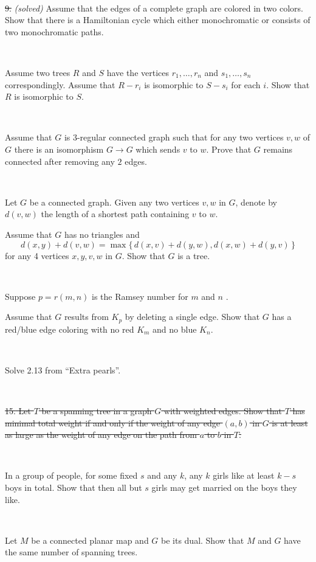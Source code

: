 \documentclass[oneside,a4paper]{article}
\begin{document}
\ 

\noindent \sout{9.} \textit{(solved)} 
Assume that the edges of a complete graph are colored in two colors.
Show that there is a Hamiltonian cycle which either monochromatic or consists of two monochromatic paths.

\ 

Assume two trees $R$ and $S$ 
have the vertices $r_1,\dots,r_n$ and $s_1,\dots,s_n$ correspondingly.
Assume that $R-r_i$ is isomorphic to $S-s_i$ for each $i$.
Show that $R$ is isomorphic to $S$.

\ 

Assume that $G$ is $3$-regular connected graph such that 
for any two vertices $v,w$ of $G$ there is an isomorphism
$G\to G$ which sends $v$ to $w$.
Prove that $G$ remains connected after removing any $2$ edges.

\ 

Let $G$ be a connected graph.
Given any two vertices $v,w$ in $G$, denote by $d(v,w)$ the length of a shortest path containing $v$ to $w$. 

Assume that $G$ has no triangles and
\[d(x,y)+d(v,w)=\max\{\,d(x,v)+d(y,w),d(x,w)+d(y,v)\,\}\]
for any 4 vertices $x,y,v,w$ in $G$.
Show that $G$ is a tree.

\ 

Suppose $p=r(m,n)$ is the Ramsey number for $m$ and $n$%
.

Assume that $G$ results from $K_p$ by deleting a single edge.
Show that $G$ has a red/blue edge coloring with no red
$K_m$ and no blue $K_n$.

\ 

 Solve 2.13 from ``Extra pearls''.

\ 

\noindent \sout{{15.} Let $T$ be a spanning tree in a graph $G$ with weighted edges.
Show that $T$ has minimal total weight if and only if the weight of any edge $(a,b)$ in $G$ is at least as large as the weight of any edge on the path from $a$ to $b$ in $T$.}  

\ 

 In a group of people, for some fixed $s$ and any $k$,
any $k$ girls like at least $k-s$ boys in total.
Show that then all but $s$ girls may get married on the boys they like.


\ 

Let $M$ be a connected planar map and $G$ be its dual.
Show that $M$ and $G$ have the same number of spanning trees.
\end{document}
